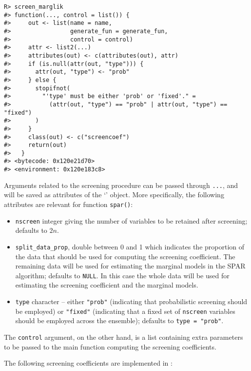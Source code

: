 \documentclass[
  article]{jss}
\newcommand{\class}[1]{`\code{#1}'}
\begin{document}
\begin{verbatim}
R> screen_marglik
#> function(..., control = list()) {
#>     out <- list(name = name,
#>                 generate_fun = generate_fun,
#>                 control = control)
#>     attr <- list2(...)
#>     attributes(out) <- c(attributes(out), attr)
#>     if (is.null(attr(out, "type"))) {
#>       attr(out, "type") <- "prob"
#>     } else {
#>       stopifnot(
#>         "'type' must be either 'prob' or 'fixed'." =
#>           (attr(out, "type") == "prob" | attr(out, "type") == "fixed")
#>       )
#>     }
#>     class(out) <- c("screencoef")
#>     return(out)
#>   }
#> <bytecode: 0x120e21d70>
#> <environment: 0x120e183c8>
\end{verbatim}

Arguments related to the screening procedure can be passed through
\texttt{...}, and will be saved as attributes of the \class{screencoef}
object. More specifically, the following attributes are relevant for
function \texttt{spar()}:

\begin{itemize}
\item
  \texttt{nscreen} integer giving the number of variables to be retained
  after screening; defaults to \(2n\).
\item
  \texttt{split\_data\_prop}, double between 0 and 1 which indicates the
  proportion of the data that should be used for computing the screening
  coefficient. The remaining data will be used for estimating the
  marginal models in the SPAR algorithm; defaults to \texttt{NULL}. In
  this case the whole data will be used for estimating the screening
  coefficient and the marginal models.
\item
  \texttt{type} character -- either \texttt{"prob"} (indicating that
  probabilistic screening should be employed) or \texttt{"fixed"}
  (indicating that a fixed set of \texttt{nscreen} variables should be
  employed across the ensemble); defaults to \texttt{type\ =\ "prob"}.
\end{itemize}

The \texttt{control} argument, on the other hand, is a list containing
extra parameters to be passed to the main function computing the
screening coefficients.

The following screening coefficients are implemented in :
\end{document}
